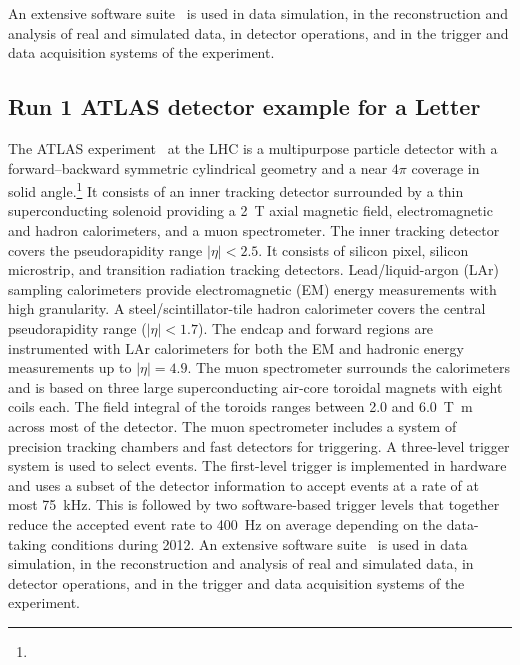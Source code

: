 An extensive software suite~\cite{ATL-SOFT-PUB-2021-001} is used in data simulation, in the reconstruction
and analysis of real and simulated data, in detector operations, and in the trigger and data acquisition
systems of the experiment.

\subsection{Run 1 ATLAS detector example for a Letter}
\label{sec:atlas1a}

The ATLAS experiment~\cite{PERF-2007-01} at the LHC is a multipurpose particle detector
with a forward--backward symmetric cylindrical geometry and a near \(4\pi\) coverage in 
solid angle.\footnote{\AtlasCoordFootnote}
It consists of an inner tracking detector surrounded by a thin superconducting solenoid
providing a \qty{2}{\tesla} axial magnetic field, electromagnetic and hadron calorimeters, and a muon spectrometer.
The inner tracking detector covers the pseudorapidity range \(|\eta| < 2.5\).
It consists of silicon pixel, silicon microstrip, and transition radiation tracking detectors.
Lead/liquid-argon (LAr) sampling calorimeters provide electromagnetic (EM) energy measurements
with high granularity.
A steel/scintillator-tile hadron calorimeter covers the central pseudorapidity range (\(|\eta| < 1.7\)).
The endcap and forward regions are instrumented with LAr calorimeters
for both the EM and hadronic energy measurements up to \(|\eta| = 4.9\).
The muon spectrometer surrounds the calorimeters and is based on
three large superconducting air-core toroidal magnets with eight coils each.
The field integral of the toroids ranges between \num{2.0} and \qty{6.0}{\tesla\metre}
across most of the detector. 
The muon spectrometer includes a system of precision tracking chambers and fast detectors for triggering.
A three-level trigger system is used to select events.
The first-level trigger is implemented in hardware and uses a subset of the detector information
to accept events at a rate of at most \qty{75}{\kilo\hertz}.
This is followed by two software-based trigger levels that
together reduce the accepted event rate to \qty{400}{\hertz} on average
depending on the data-taking conditions during 2012.
An extensive software suite~\cite{ATL-SOFT-PUB-2021-001} is used in data simulation, in the reconstruction
and analysis of real and simulated data, in detector operations, and in the trigger and data acquisition
systems of the experiment.



